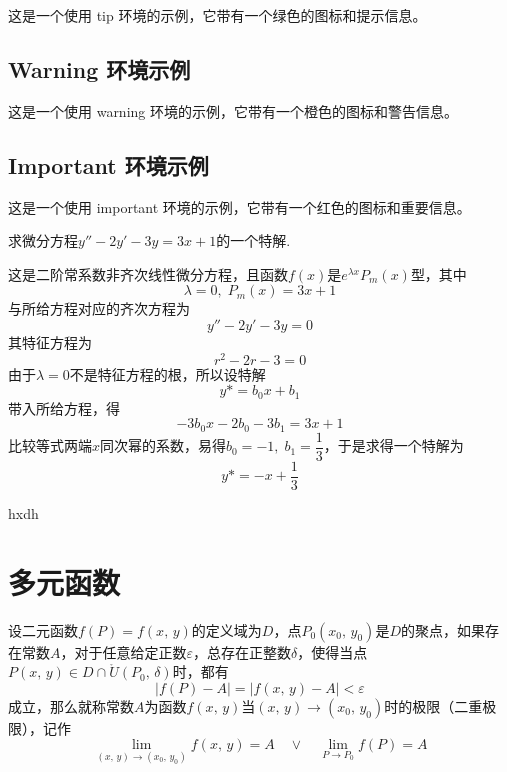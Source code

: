 \documentclass[12pt, a4paper, oneside, UTF8]{ctexbook}
\begin{document}
	\begin{tip}
		这是一个使用 tip 环境的示例，它带有一个绿色的图标和提示信息。
	\end{tip}
	
	\subsection{Warning 环境示例}
	
	\begin{warning}
		这是一个使用 warning 环境的示例，它带有一个橙色的图标和警告信息。
	\end{warning}
	
	\subsection{Important 环境示例}
	
	\begin{important}
		这是一个使用 important 环境的示例，它带有一个红色的图标和重要信息。
	\end{important}
	\begin{example}
		求微分方程$y''-2y'-3y=3x+1$的一个特解.
	\end{example}
	\begin{solution}
		这是二阶常系数非齐次线性微分方程，且函数$f(x)$是$e^{\lambda{x}}P_m(x)$型，其中
		\[
		\lambda = 0,\;P_m(x) = 3x+1
		\]
		与所给方程对应的齐次方程为
		\[
		y''-2y'-3y=0
		\]
		其特征方程为
		\[
		r^2-2r-3 = 0
		\]
		由于$\lambda = 0$不是特征方程的根，所以设特解
		\[
		y* = b_0 x + b_1
		\]
		带入所给方程，得
		\[
		-3b_0 x - 2b_0 - 3b_1 = 3x+1
		\]
		比较等式两端$x$同次幂的系数，易得$b_0 = -1,\;b_1 = \dfrac{1}{3}$，于是求得一个特解为
		\[
		y* = -x + \frac{1}{3}
		\]
	\end{solution}
	\begin{solution}
		hxdh
	\end{solution}
	
	\section{多元函数}
	\begin{defn}
		设二元函数$f(P) = f(x,\,y)$的定义域为$D$，点$P_0(x_0,\,y_0)$是$D$的聚点，如果存在常数$A$，对于任意给定正数$\varepsilon$，总存在正整数$\delta$，使得当点$P(x,\,y) \in D \cap \mathring{U}(P_0,\,\delta)$时，都有
		\[
		|f(P)-A| = |f(x,\,y) - A| < \varepsilon
		\]
		成立，那么就称常数$A$为函数$f(x,\,y)$当$(x,\,y) \to (x_0,\,y_0)$时的极限（二重极限），记作
		\[
		\lim_{(x,\,y) \to (x_0,\,y_0)}f(x,\,y) = A \quad \lor \quad \lim_{P \to P_0}f(P) = A
		\]
	\end{defn}
	
\end{document}
